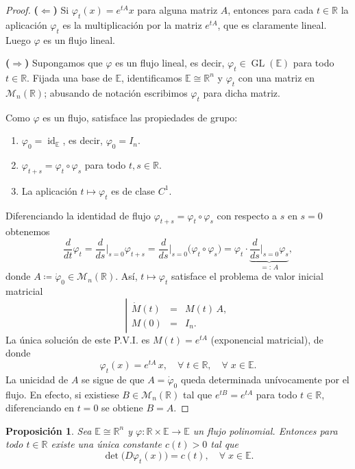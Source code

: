 \documentclass[11pt,a4paper]{article}
\theoremstyle{definition}
\theoremstyle{plain}
\newtheorem{proposicion}{Proposición}[section]
\theoremstyle{remark}
\begin{document}
	\begin{proof}
		\textbf{($\Leftarrow$)} Si $\varphi_t(x) = e^{tA}x$ para alguna matriz $A$, entonces para cada $t \in \mathbb{R}$ la aplicación $\varphi_t$ es la multiplicación por la matriz $e^{tA}$, que es claramente lineal. Luego $\varphi$ es un flujo lineal.

		\textbf{($\Rightarrow$)} Supongamos que $\varphi$ es un flujo lineal, es decir, $\varphi_t \in \operatorname{GL}(\mathbb{E})$ para todo $t \in \mathbb{R}$. Fijada una base de $\mathbb{E}$, identificamos $\mathbb{E} \cong \mathbb{R}^n$ y $\varphi_t$ con una matriz en $\mathcal{M}_n(\mathbb{R})$; abusando de notación escribimos $\varphi_t$ para dicha matriz.

		Como $\varphi$ es un flujo, satisface las propiedades de grupo:
		\begin{enumerate}[label=\roman*)]
			\item $\varphi_0 = \operatorname{id}_{\mathbb{E}}$, es decir, $\varphi_0 = I_n$.
			\item $\varphi_{t+s} = \varphi_t \circ \varphi_s$ para todo $t, s \in \mathbb{R}$.
			\item La aplicación $t \mapsto \varphi_t$ es de clase $C^1$.
		\end{enumerate}
		Diferenciando la identidad de flujo $\varphi_{t+s} = \varphi_t \circ \varphi_s$ con respecto a $s$ en $s = 0$ obtenemos
		\[
			\frac{d}{dt}\varphi_t = \frac{d}{ds}\Big|_{s=0} \varphi_{t+s} = \frac{d}{ds}\Big|_{s=0} \bigl(\varphi_t \circ \varphi_s\bigr) = \varphi_t \cdot \underbrace{\frac{d}{ds}\Big|_{s=0} \varphi_s}_{=:\, A},
		\]
		donde $A \coloneqq \dot{\varphi}_0 \in \mathcal{M}_n(\mathbb{R})$. Así, $t \mapsto \varphi_t$ satisface el problema de valor inicial matricial
		\[
			\left|
			\begin{array}{lcl}
				\dot{M}(t) &=& M(t)\,A, \\
				M(0) &=& I_n.
			\end{array}
			\right.
		\]
		La única solución de este P.V.I. es $M(t) = e^{tA}$ (exponencial matricial), de donde
		\[
			\varphi_t(x) = e^{tA}\,x, \quad \forall \; t \in \mathbb{R}, \quad \forall \; x \in \mathbb{E}.
		\]
		La unicidad de $A$ se sigue de que $A = \dot{\varphi}_0$ queda determinada unívocamente por el flujo. En efecto, si existiese $B \in \mathcal{M}_n(\mathbb{R})$ tal que $e^{tB} = e^{tA}$ para todo $t \in \mathbb{R}$, diferenciando en $t = 0$ se obtiene $B = A$.
	\end{proof}

	\begin{proposicion}
		Sea $\mathbb{E} \cong \mathbb{R}^n$ y $\varphi : \mathbb{R} \times \mathbb{E} \to \mathbb{E}$ un flujo polinomial. Entonces para todo $t \in \mathbb{R}$ existe una única constante $c(t) > 0$ tal que
		\[
			\det\bigl(D\varphi_t(x)\bigr) = c(t), \quad \forall \; x \in \mathbb{E}.
		\]
	\end{proposicion}
\end{document}
